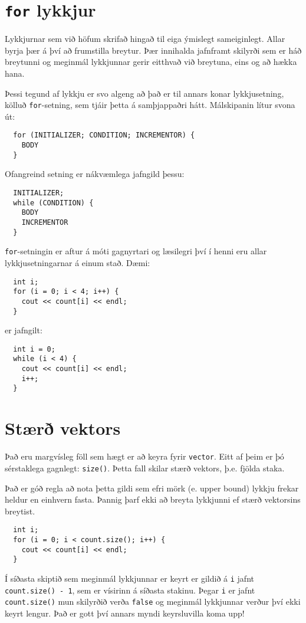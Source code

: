 \section{{\tt for} lykkjur}

Lykkjurnar sem við höfum skrifað hingað til eiga ýmislegt sameiginlegt.
Allar byrja þær á því að frumstilla breytur.
Þær innihalda jafnframt skilyrði sem er háð breytunni og meginmál lykkjunnar gerir eitthvað við breytuna, eins og að hækka hana. 


Þessi tegund af lykkju er svo algeng að það er til annars konar lykkjusetning, kölluð {\tt for}-setning, sem tjáir þetta á samþjappaðri hátt.
Málskipanin lítur svona út:

\begin{verbatim}
  for (INITIALIZER; CONDITION; INCREMENTOR) {
    BODY
  }
\end{verbatim}
%
Ofangreind setning er nákvæmlega jafngild þessu:

\begin{verbatim}
  INITIALIZER;
  while (CONDITION) {
    BODY
    INCREMENTOR
  }
\end{verbatim}
%
{\tt for}-setningin er aftur á móti gagnyrtari og læsilegri því í henni eru allar lykkjusetningarnar á einum stað.
Dæmi:

\begin{verbatim}
  int i;
  for (i = 0; i < 4; i++) {
    cout << count[i] << endl;
  }
\end{verbatim}
%
er jafngilt:

\begin{verbatim}
  int i = 0;
  while (i < 4) {
    cout << count[i] << endl;
    i++;
  }
\end{verbatim}

\section{Stærð vektors}

Það eru margvísleg föll sem hægt er að keyra fyrir {\tt vector}.
Eitt af þeim er þó sérstaklega gagnlegt: {\tt size()}.
Þetta fall skilar stærð vektors, þ.e. fjölda staka.

Það er góð regla að nota þetta gildi sem efri mörk (e. upper bound) lykkju frekar heldur en einhvern fasta.
Þannig þarf ekki að breyta lykkjunni ef stærð vektorsins breytist.

\begin{verbatim}
  int i;
  for (i = 0; i < count.size(); i++) {
    cout << count[i] << endl;
  }
\end{verbatim}
%
Í síðasta skiptið sem meginmál lykkjunnar er keyrt er gildið á {\tt i} jafnt {\tt count.size() - 1}, sem er vísirinn á síðasta stakinu.
Þegar {\tt i} er jafnt {\tt count.size()} mun skilyrðið verða {\tt false} og meginmál lykkjunnar verður því ekki keyrt lengur.
Það er gott því annars myndi keyrsluvilla koma upp!

